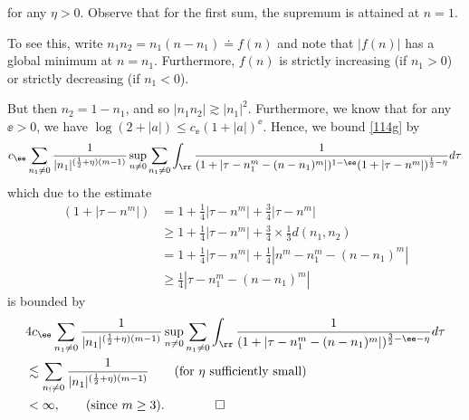 %
for any $\eta >0$.
Observe that for the first sum, the supremum is attained at $n=1$.
%
%
\begin{framed}
\begin{remark}
To see this,
write $n_1 n_2 = n_1(n-n_1) \doteq f(n)$ and note that $|f(n)|$ has a global
minimum at $n=n_1$. Furthermore, $f(n)$ is strictly
increasing (if $n_1>0$) or strictly decreasing (if $n_1 <0$).
\end{remark}
\end{framed}
%
%
%
But then $n_2 = 1 - n_1$, and so $| n_1 n_2 | \gtrsim | n_1 |^2$. Furthermore, we know that 
for any $\ee > 0$, we have $\log (2 + | a |) \le c_{\ee}(1 + | a
|)^{\ee}$. Hence, we bound \eqref{114g} by
%
%
%
%
\begin{equation*}
	\begin{split}
		c_{\ee}  \sum_{n_1 \neq 0} \frac{1}{|n_1|^{(\frac{1}{2} + \eta)(m-1)}}
		\sup_{n \neq 0} \sum_{n_1 \neq 0} \int_{\rr} \frac{1}{(1 +
		| \tau - n_{1}^m - (n - n_{1})^m |)^{1- \ee}(1 + | \tau - n^m
		|)^{\frac{1}{2}-\eta}} d \tau
	\end{split}
\end{equation*}
%
%
%
which due to the estimate
%
%
\begin{equation}
	\label{116g}
	\begin{split}
		(1 + | \tau - n^m |)
		& = 1 + \frac{1}{4}| \tau - n^m | + \frac{3}{4}| \tau - n^m |
		\\
		& \ge 1 + \frac{1}{4}| \tau - n^m | + \frac{3}{4} \times
		\frac{1}{3}d(n_1,n_2)
		\\
		& = 1 + \frac{1}{4}| \tau - n^m | + \frac{1}{4}| n^m - n_1^m - (n -
		n_1)^m |
		\\
		& \ge \frac{1}{4}| \tau - n_1^m - (n - n_1)^m |
	\end{split}
\end{equation}
%
%
is bounded by
%
%
\begin{equation}
	\label{115g}
	\begin{split}
		& 4 c_{\ee} \sum_{n_1 \neq 0} \frac{1}{| n_1 |^{(\frac{1}{2} +
		\eta)(m-1)}} 	\sup_{n \neq 0} \sum_{n_1 \neq 0}	\int_{\rr} \frac{1}{(1 + |
		\tau - n_{1}^m - (n - n_{1})^m |)^{\frac{3}{2}-\ee - \eta}} d \tau
		\\
		& \lesssim \sum_{n_! \neq 0} \frac{1}{| n_1 |^{(\frac{1}{2} +
		\eta)(m-1)}} 		\qquad (\text{for} \ \eta \ \text{sufficiently small})
		\\
		& < \infty, \qquad (\text{since} \ m \ge 3). \qquad \qed
	\end{split}
\end{equation}
%
%
%
%
%
%
